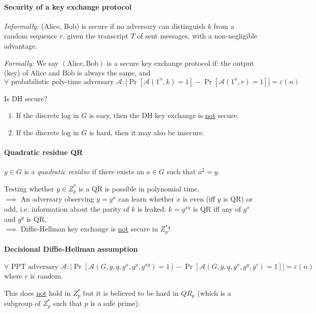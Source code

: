 \paragraph{Security of a key exchange protocol}\mbox{}

\textit{Informally:} (Alice, Bob) is secure if no adversary can distinguish $k$ from a random sequence $r$, given the transcript $T$ of sent messages, with a non-negligible advantage.

\textit{Formally:} We say $(\text{Alice}, \text{Bob})$ is a secure key exchange protocol if: the output (key) of Alice and Bob is always the same, and 
$$\forall \text{ probabilistic poly-time adversary } \mathcal{A}: |\Pr[\mathcal{A}(1^n,k) = 1] - \Pr[\mathcal{A}(1^n,r) = 1]| = \varepsilon(n)$$

Is DH secure?

\begin{enumerate}[label=\Alph*)]
    \item If the discrete log in $G$ is easy, then the DH key exchange is \underline{not} secure.
    \item If the discrete log in $G$ is hard, then it may also be insecure.
\end{enumerate}

\paragraph{Quadratic residue QR} $y \in G$ is a \textit{quadratic residue} if there exists an $a \in G$ such that $a^2 = y$.

\Lightning \mbox{} Testing whether $y \in Z_p^*$ is a QR is possible in polynomial time. \\
$\implies$ An adversary observing $y = g^x$ can learn whether $x$ is even (iff $y$ is QR) or odd, i.e. information about the parity of $k$ is leaked: $k = g^{xy}$ is QR iff any of $g^x$ and $g^y$ is QR. \\
$\implies$ Diffie-Hellman key exchange is \underline{not} secure  in $Z_p^*$!

\paragraph{Decisional Diffie-Hellman assumption}
$$\forall \text{ PPT adversary } \mathcal{A}: |\Pr[\mathcal{A}(G, g, q, g^x, g^y, g^{xy}) = 1] - \Pr[\mathcal{A}(G, g, q, g^x, g^y, g^r) = 1]| = \varepsilon(n)$$
where $r$ is random.

This does \underline{not} hold in $Z^*_p$ but it is believed to be hard in $QR_p$ (which is a subgroup of $Z^*_p$ such that $p$ is a safe prime).


